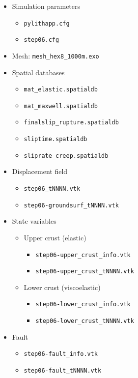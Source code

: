 \documentclass[pdftex,cig,slideColor]{pp4slides}
\begin{document}
{\small
 \hspace*{-0.5in}
  \begin{minipage}[t]{4.5in}
    {}
    \begin{itemize}
    \item Simulation parameters
      \begin{itemize}
      \item {\tt pylithapp.cfg}
      \item {\tt step06.cfg}
      \end{itemize}
    \item Mesh: {\tt mesh\_hex8\_1000m.exo}
    \item Spatial databases
      \begin{itemize}
      \item {\tt mat\_elastic.spatialdb}
      \item {\tt mat\_maxwell.spatialdb}
      \item {\tt finalslip\_rupture.spatialdb}
      \item {\tt sliptime.spatialdb}
      \item {\tt sliprate\_creep.spatialdb}
      \end{itemize}
    \end{itemize}
  \end{minipage}
  \hfill
  \begin{minipage}[t]{4.75in}
    {}
    \begin{itemize}
   \item Displacement field
      \begin{itemize}
      \item {\tt step06\_tNNNN.vtk}
      \item {\tt step06-groundsurf\_tNNNN.vtk}
      \end{itemize}
    \item State variables
      \begin{itemize}
      \item Upper crust (elastic)
        \begin{itemize}
        \item {\tt step06-upper\_crust\_info.vtk}
        \item {\tt step06-upper\_crust\_tNNNN.vtk}
        \end{itemize}
      \item Lower crust (viscoelastic)
        \begin{itemize}
        \item {\tt step06-lower\_crust\_info.vtk}
        \item {\tt step06-lower\_crust\_tNNNN.vtk}
        \end{itemize}
      \end{itemize}
    \item Fault
      \begin{itemize}
      \item {\tt step06-fault\_info.vtk}
      \item {\tt step06-fault\_tNNNN.vtk}
      \end{itemize}
    \end{itemize}
  \end{minipage}   
}
\end{document}
